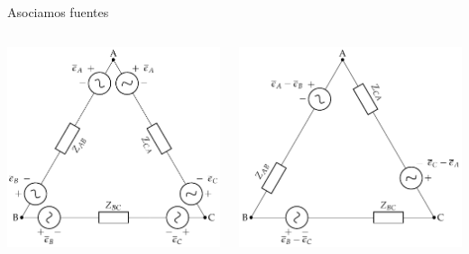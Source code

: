\documentclass[aspectratio=169, usenames,svgnames,dvipsnames]{beamer}
\begin{document}
\begin{frame}[label={sec:org1a8c5ca}]{Asociamos fuentes}
\begin{columns}
\begin{column}{0.4\columnwidth}
\begin{center}
\includegraphics[width=\textwidth]{../figs/GeneradorRealEstrella_Transformado1.pdf}
\end{center}
\end{column}
\begin{column}{0.4\columnwidth}
\begin{center}
\includegraphics[width=\textwidth]{../figs/GeneradorRealEstrella_Transformado2.pdf}
\end{center}
\end{column}
\end{columns}
\end{frame}
\end{document}
